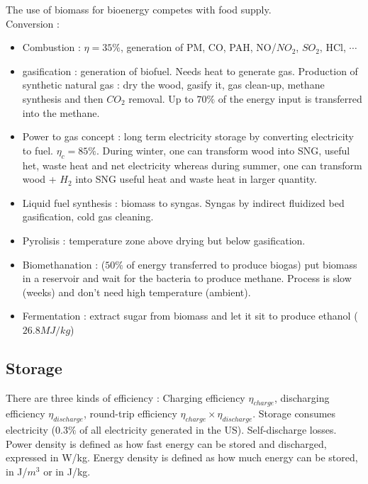 \documentclass[../main.tex]{subfiles}
\begin{document}
The use of biomass for bioenergy competes with food supply. \\
Conversion : \begin{itemize}
    \item Combustion : $\eta = 35\%$, generation of PM, CO, PAH, NO/$NO_2$, $SO_2$, HCl, $\cdots$
    \item gasification : generation of biofuel. Needs heat to generate gas. Production of synthetic natural gas : dry the wood, gasify it, gas clean-up, methane synthesis and then $CO_2$ removal. Up to $70\%$ of the energy input is transferred into the methane.
    \item Power to gas concept : long term electricity storage by converting electricity to fuel. $\eta_c = 85\%$. During winter, one can transform wood into SNG, useful het, waste heat and net electricity whereas during summer, one can transform wood + $H_2$ into SNG useful heat and waste heat in larger quantity.
    \item Liquid fuel synthesis : biomass to syngas. Syngas by indirect fluidized bed gasification, cold gas cleaning. 
    \item Pyrolisis : temperature zone above drying but below gasification. 
    \item Biomethanation : ($50\%$ of energy transferred to produce biogas) put biomass in a reservoir and wait for the bacteria to produce methane. Process is slow (weeks) and don't need high temperature (ambient).
    \item Fermentation : extract sugar from biomass and let it sit to produce ethanol ($26.8 MJ/kg$)
\end{itemize}

\subsection{Storage}
There are three kinds of efficiency : Charging efficiency $\eta_{charge}$, discharging efficiency $\eta_{discharge}$, round-trip efficiency $\eta_{charge} \times \eta_{discharge}$. Storage consumes electricity ($0.3\%$ of all electricity generated in the US). Self-discharge losses. Power density is defined as how fast energy can be stored and discharged, expressed in W/kg. Energy density is defined as how much energy can be stored, in J/$m^3$ or in J/kg.\\
\end{document}
